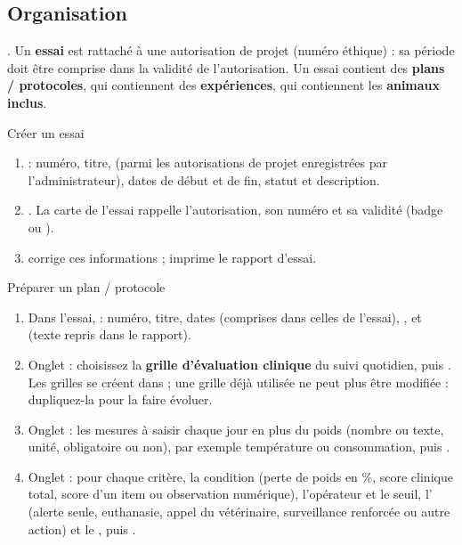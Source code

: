 \documentclass[11pt,a4paper]{article}
\begin{document}
\subsection{Organisation}
. Un \textbf{essai} est
rattaché à une autorisation de projet (numéro éthique) : sa période doit être
comprise dans la validité de l'autorisation. Un essai contient des
\textbf{plans / protocoles}, qui contiennent des \textbf{expériences}, qui
contiennent les \textbf{animaux inclus}.

\begin{procedure}{Créer un essai}
\begin{enumerate}
  \item {} : numéro, titre,  (parmi les
    autorisations de projet enregistrées par l'administrateur), dates de
    début et de fin, statut et description.
  \item {}. La carte de l'essai rappelle l'autorisation,
    son numéro et sa validité (badge  ou ).
  \item {} corrige ces informations ; 
    imprime le rapport d'essai.
\end{enumerate}
\end{procedure}

\begin{procedure}{Préparer un plan / protocole}
\begin{enumerate}
  \item Dans l'essai,  : numéro, titre, dates
    (comprises dans celles de l'essai), ,
     et 
    (texte repris dans le rapport).
  \item Onglet  : choisissez la \textbf{grille
    d'évaluation clinique} du suivi quotidien, puis . Les grilles se créent dans  ; une grille déjà utilisée ne peut plus être
    modifiée : dupliquez-la pour la faire évoluer.
  \item Onglet  : les mesures à saisir chaque jour en plus
    du poids (nombre ou texte, unité, obligatoire ou non), par exemple
    température ou consommation, puis .
  \item Onglet  : pour chaque critère, la condition
    (perte de poids en \%, score clinique total, score d'un item ou
    observation numérique), l'opérateur et le seuil, l'
    (alerte seule, euthanasie, appel du vétérinaire, surveillance renforcée
    ou autre action) et le , puis
    .
\end{enumerate}
\end{procedure}
\end{document}

